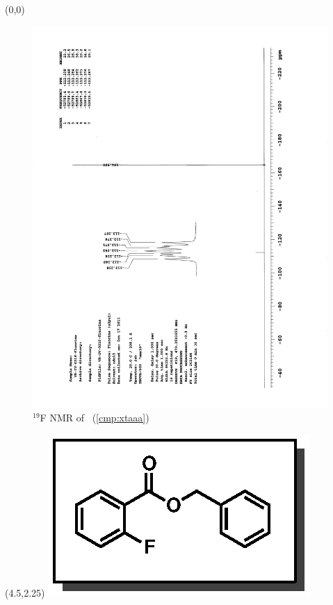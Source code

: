 \clearpage
\begin{textblock}{20}(0,0)
\begin{figure}[htb]
\caption{$^{19}$F NMR of  \CMPxtaaa\ (\ref{cmp:xtaaa})}
\includegraphics[scale=0.75, trim = 0mm 0mm 0mm 5mm,
clip]{chp_asymmetric/images/nmr/xtaaaF}
\vspace{-100pt}
\end{figure}
\end{textblock}
\begin{textblock}{1}(4.5,2.25)
\includegraphics[scale=0.8, angle=90]{chp_asymmetric/images/xtaaa}
\end{textblock}
\clearpage

